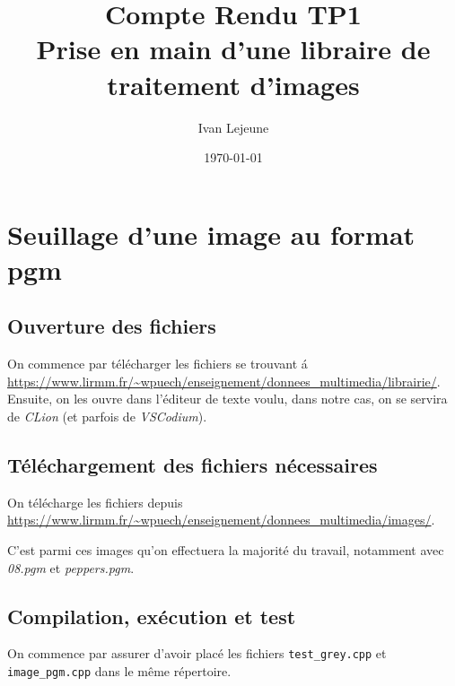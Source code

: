 \documentclass[french,a4paper,10pt]{article}
\title{Compte Rendu TP1\\Prise en main d'une libraire de traitement d'images}
\author{Ivan Lejeune}
\date{\today}
\begin{document}
	\maketitle

	\tableofcontents

	\newpage
	\section{Seuillage d'une image au format pgm}\label{sec:1}

	\subsection{Ouverture des fichiers}\label{subsec:1.1}
	On commence par t\'el\'echarger les fichiers se trouvant \'a
	\url{https://www.lirmm.fr/~wpuech/enseignement/donnees_multimedia/librairie/}.
	Ensuite, on les ouvre dans l'\'editeur de texte voulu, dans notre cas, on se servira de \emph{CLion}
	(et parfois de \emph{VSCodium}).
	
	\subsection{Téléchargement des fichiers nécessaires}\label{subsec:1.2}

	On t\'el\'echarge les fichiers depuis \url{https://www.lirmm.fr/~wpuech/enseignement/donnees_multimedia/images/}.

	C'est parmi ces images qu'on effectuera la majorit\'e du travail, notamment avec \emph{08.pgm} et \emph{peppers.pgm}.

	\subsection{Compilation, ex\'ecution et test}\label{subsec:1.3}

	On commence par assurer d'avoir plac\'e les fichiers \texttt{test\_grey.cpp} et \texttt{image\_pgm.cpp} dans le
	m\^eme r\'epertoire.
\end{document}
